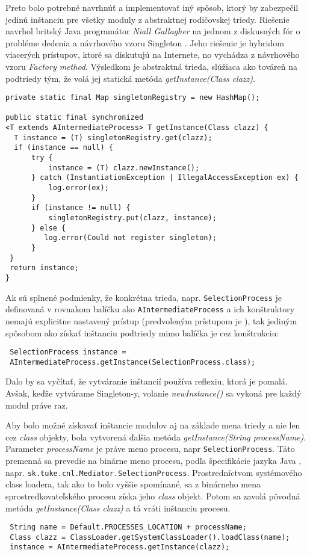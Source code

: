 Preto bolo potrebné navrhnúť a implementovať iný spôsob, ktorý by zabezpečil jedinú inštanciu pre všetky 
moduly z abstraktnej rodičovskej triedy. Riešenie navrhol britský Java programátor \emph{Niall Gallagher}
na jednom z diskusných fór o probléme dedenia a návrhového vzoru Singleton \citep{gallagher}.
Jeho riešenie je hybridom viacerých prístupov, ktoré sa diskutujú na Internete, no vychádza z 
návrhového vzoru \emph{Factory method}. Výsledkom je abstraktná trieda, slúžiaca ako továreň na 
podtriedy tým, že volá jej statická metóda \emph{getInstance(Class clazz)}. 
\begin{verbatim}
private static final Map singletonRegistry = new HashMap();

public static final synchronized 
<T extends AIntermediateProcess> T getInstance(Class clazz) {
  T instance = (T) singletonRegistry.get(clazz);
  if (instance == null) {
      try {
          instance = (T) clazz.newInstance();
      } catch (InstantiationException | IllegalAccessException ex) {
          log.error(ex);
      }
      if (instance != null) {
          singletonRegistry.put(clazz, instance);
      } else {
         log.error(Could not register singleton);
      }
 }
 return instance;
}
\end{verbatim}
Ak sú splnené podmienky, že konkrétna trieda, napr. \verb|SelectionProcess| je definovaná v rovnakom 
balíčku ako \verb|AIntermediateProcess| a ich konštruktory nemajú explicitne nastavený prístup 
(predvoleným prístupom je ), tak 
jediným spôsobom ako získať inštanciu podtriedy mimo balíčka je cez konštrukciu:
\begin{verbatim}
 SelectionProcess instance = 
 AIntermediateProcess.getInstance(SelectionProcess.class);
\end{verbatim}
Dalo by sa vyčítať, že vytváranie inštancií používa reflexiu, ktorá je pomalá. Avšak, keďže vytvárame 
Singleton-y, volanie \emph{newInstance()} sa vykoná pre každý modul práve raz.

Aby bolo možné získavať inštancie modulov aj na základe mena triedy a nie len cez \emph{class} objekty, bola 
vytvorená ďalšia metóda \emph{getInstance(String processName)}. Parameter \emph{processName} je práve meno 
procesu, napr \verb|SelectionProcess|. Táto premenná sa prevedie na binárne meno procesu, 
podľa špecifikácie jazyka Java \citep{java_spec},
napr. \verb|sk.tuke.cnl.Mediator.SelectionProcess|.
Prostredníctvom systémového class loadera, tak ako to bolo vyššie spomínané, sa z binárneho mena 
sprostredkovateľského procesu získa jeho \emph{class} objekt. Potom sa zavolá pôvodná metóda 
\emph{getInstance(Class clazz)} a tá vráti inštanciu procesu.
\begin{verbatim}
 String name = Default.PROCESSES_LOCATION + processName;
 Class clazz = ClassLoader.getSystemClassLoader().loadClass(name);
 instance = AIntermediateProcess.getInstance(clazz);
\end{verbatim}



